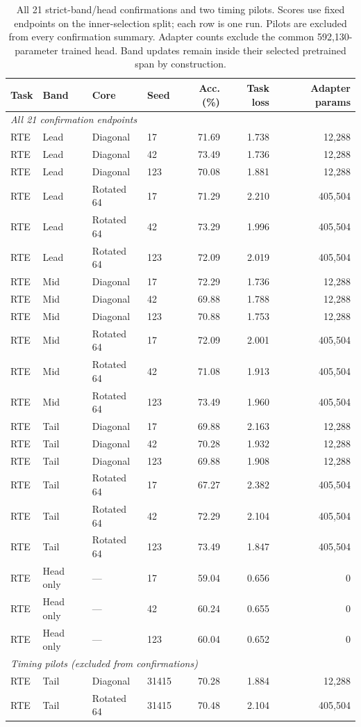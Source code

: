 \documentclass{article}
\begin{document}
\begin{table}[t]
\centering
\caption{All 21 strict-band/head confirmations and two timing pilots. Scores use fixed endpoints on the inner-selection split; each row is one run. Pilots are excluded from every confirmation summary. Adapter counts exclude the common 592,130-parameter trained head. Band updates remain inside their selected pretrained span by construction.}
\label{tab:bandavailable}
\begin{tabular}{llllrrr}
\toprule
Task & Band & Core & Seed & Acc. (\%) & Task loss & Adapter params\\
\midrule
\multicolumn{7}{l}{\textit{All 21 confirmation endpoints}} \\
RTE & Lead & Diagonal & 17 & 71.69 & 1.738 & 12,288 \\
RTE & Lead & Diagonal & 42 & 73.49 & 1.736 & 12,288 \\
RTE & Lead & Diagonal & 123 & 70.08 & 1.881 & 12,288 \\
RTE & Lead & Rotated 64 & 17 & 71.29 & 2.210 & 405,504 \\
RTE & Lead & Rotated 64 & 42 & 73.29 & 1.996 & 405,504 \\
RTE & Lead & Rotated 64 & 123 & 72.09 & 2.019 & 405,504 \\
RTE & Mid & Diagonal & 17 & 72.29 & 1.736 & 12,288 \\
RTE & Mid & Diagonal & 42 & 69.88 & 1.788 & 12,288 \\
RTE & Mid & Diagonal & 123 & 70.88 & 1.753 & 12,288 \\
RTE & Mid & Rotated 64 & 17 & 72.09 & 2.001 & 405,504 \\
RTE & Mid & Rotated 64 & 42 & 71.08 & 1.913 & 405,504 \\
RTE & Mid & Rotated 64 & 123 & 73.49 & 1.960 & 405,504 \\
RTE & Tail & Diagonal & 17 & 69.88 & 2.163 & 12,288 \\
RTE & Tail & Diagonal & 42 & 70.28 & 1.932 & 12,288 \\
RTE & Tail & Diagonal & 123 & 69.88 & 1.908 & 12,288 \\
RTE & Tail & Rotated 64 & 17 & 67.27 & 2.382 & 405,504 \\
RTE & Tail & Rotated 64 & 42 & 72.29 & 2.104 & 405,504 \\
RTE & Tail & Rotated 64 & 123 & 73.49 & 1.847 & 405,504 \\
RTE & Head only & --- & 17 & 59.04 & 0.656 & 0 \\
RTE & Head only & --- & 42 & 60.24 & 0.655 & 0 \\
RTE & Head only & --- & 123 & 60.04 & 0.652 & 0 \\
\midrule
\multicolumn{7}{l}{\textit{Timing pilots (excluded from confirmations)}} \\
RTE & Tail & Diagonal & 31415 & 70.28 & 1.884 & 12,288 \\
RTE & Tail & Rotated 64 & 31415 & 70.48 & 2.104 & 405,504 \\
\bottomrule
\end{tabular}
\end{table}
\end{document}
